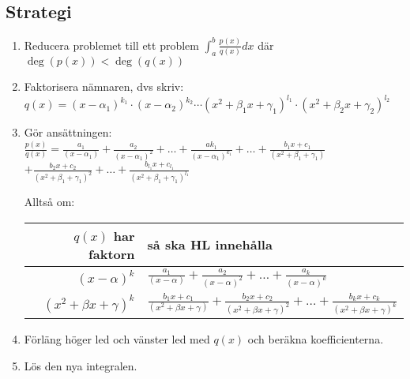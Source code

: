 \documentclass{article}
\begin{document}
\subsection{Strategi}
\begin{enumerate}
   \item Reducera problemet till ett problem ${\displaystyle\int_{a}^{b}\frac{p(x)}{q(x)}dx}$ där $\deg(p(x))<\deg(q(x))$
   \item Faktorisera nämnaren, dvs skriv:\\
   $q(x)=(x-\alpha_{1})^{k_{1}}\cdot(x-\alpha_{2})^{k_{2}}\cdots(x^2+\beta_{1}x+\gamma_{1})^{l_{1}}\cdot(x^2+\beta_{2}x+\gamma_{2})^{l_{2}}$
   \item Gör ansättningen:\\
   ${\displaystyle\frac{p(x)}{q(x)}=\frac{a_{1}}{(x-\alpha_{1})}+\frac{a_{2}}{(x-\alpha_{1})^{2}}+\ldots+\frac{ak_{1}}{(x-\alpha_{1})^{k_{1}}}+\ldots+\frac{b_{1}x+c_{1}}{(x^{2}+\beta_{1}+\gamma_{1})}}$ \\
   ${\displaystyle+\frac{b_{2}x+c_{2}}{(x^2+\beta_{1}+\gamma_{1})^{2}}+\ldots+\frac{b_{l_{1}}x+c_{l_{1}}}{(x^2+\beta_{1}+\gamma_{1})^{l_{1}}}}$

   Alltså om:
   \begin{table}[!h]
   \centering
   \begin{tabular}{|r|l|}
   \hline
$q(x)$ har faktorn       & så ska HL innehålla                        \\ \hline
   ${\displaystyle (x-\alpha)^k}$           & ${\displaystyle \frac{a_{1}}{(x-\alpha)}+\frac{a_{2}}{(x-\alpha)^2}+\ldots+\frac{a_{k}}{(x-\alpha)^k}}$                                                          \\ \hline
   ${\displaystyle(x^2+\beta x+\gamma)^k}$ & ${\displaystyle \frac{b_{1}x+c_{1}}{(x^2+\beta x+\gamma)}+\frac{b_{2}x+c_{2}}{(x^2+\beta x+\gamma)^2}+\ldots+\frac{b_{k}x+c_{k}}{(x^2+\beta x+\gamma)^k}}$  \\ \hline
   \end{tabular}
   \end{table}
   \item Förläng höger led och vänster led med $q(x)$ och beräkna koefficienterna.
   \item Lös den nya integralen.
\end{enumerate}
\end{document}
